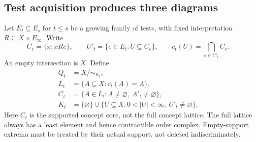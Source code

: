 \documentclass[11pt]{article}
\theoremstyle{definition}\newtheorem{definition}[theorem]{Definition}
\theoremstyle{remark}\newtheorem{remark}[theorem]{Remark}
\begin{document}
\subsection{Test acquisition produces three diagrams}
Let $E_t\subseteq E_s$ for $t\leq s$ be a growing family of tests, with
fixed interpretation $R\subseteq X\times E_\infty$. Write
\[
 C_e=\{x:xRe\},\qquad
 U'_t=\{e\in E_t:U\subseteq C_e\},\qquad
 c_t(U)=\bigcap_{e\in U'_t}C_e.
\]
An empty intersection is $X$. Define
\begin{align*}
 Q_t&=X/{\sim_{E_t}},\\
 L_t&=\{A\subseteq X:c_t(A)=A\},\\
 C_t&=\{A\in L_t:A\ne\varnothing,\ A'_t\ne\varnothing\},\\
 K_t&=\{\varnothing\}\cup
 \{U\subseteq X:0<|U|<\infty,\ U'_t\ne\varnothing\}.
\end{align*}
Here $C_t$ is the supported concept core, not the full concept lattice.
The full lattice always has a least element and hence contractible order
complex. Empty-support extrema must be treated by their actual support,
not deleted indiscriminately.
\end{document}
